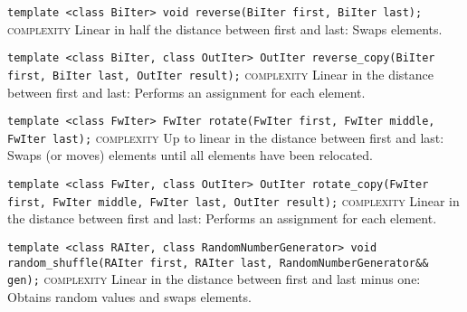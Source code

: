 \noindent{}\hspace*{0.25em}\lstinline[basicstyle=\ttfamily\color{corange}]{template <class BiIter> void reverse(BiIter first, BiIter last);} \textsc{complexity} Linear in half the distance between first and last: Swaps elements.\\\vspace{-0.6em}

\noindent{}\hspace*{0.25em}\lstinline[basicstyle=\ttfamily\color{corange}]{template <class BiIter, class OutIter> OutIter reverse_copy(BiIter first, BiIter last, OutIter result);} \textsc{complexity} Linear in the distance between first and last: Performs an assignment for each element.\\\vspace{-0.6em}

\noindent{}\hspace*{0.25em}\lstinline[basicstyle=\ttfamily\color{corange}]{template <class FwIter> FwIter rotate(FwIter first, FwIter middle, FwIter last);} \textsc{complexity} Up to linear in the distance between first and last: Swaps (or moves) elements until all elements have been relocated.\\\vspace{-0.6em}

\noindent{}\hspace*{0.25em}\lstinline[basicstyle=\ttfamily\color{corange}]{template <class FwIter, class OutIter> OutIter rotate_copy(FwIter first, FwIter middle, FwIter last, OutIter result);} \textsc{complexity} Linear in the distance between first and last: Performs an assignment for each element.\\\vspace{-0.6em}

\noindent{}\hspace*{0.25em}\lstinline[basicstyle=\ttfamily\color{corange}]{template <class RAIter, class RandomNumberGenerator> void random_shuffle(RAIter first, RAIter last, RandomNumberGenerator&& gen);} \textsc{complexity} Linear in the distance between first and last minus one: Obtains random values and swaps elements.\\\vspace{-0.6em}

